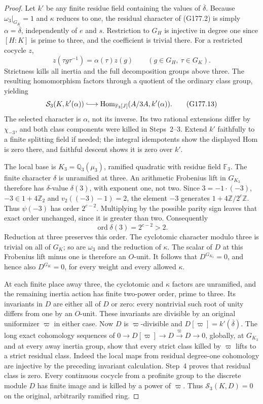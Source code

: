 \begin{proof}
Let $k'$ be any finite residue field containing the values of
$\overline\delta$.
Because $\omega_3|_{G_K}=1$ and $\kappa$ reduces to one, the
residual character of (G177.2) is simply $\alpha=\overline\delta$,
independently of $e$ and $s$.
Restriction to $G_H$ is injective in degree one since
$[H:K]$ is prime to three, and the coefficient is trivial there.
For a restricted cocycle $z$,
\[
 z(\tau g\tau^{-1})=\alpha(\tau)z(g)
                  \qquad(g\in G_H,\ \tau\in G_K).
 \tag{G177.12}
\]
Strictness kills all inertia and the full decomposition groups
above three.  The resulting homomorphism factors through a
quotient of the ordinary class group, yielding
\[
 \mathcal S_3(K,k'(\alpha))\lhook\joinrel\longrightarrow
          \operatorname{Hom}_{\mathbb F_3[J]}(A/3A,k'(\alpha)).
 \tag{G177.13}
\]
The selected character is $\alpha$, not its inverse.
Its two rational extensions differ by $\chi_{-3}$, and both
class components were killed in Steps~2--3.
Extend $k'$ faithfully to a finite splitting field if needed;
the integral idempotents show the displayed Hom is zero there,
and faithful descent shows it is zero over $k'$.

The local base is $K_3=\mathbb Q_3(\mu_3)$, ramified quadratic
with residue field $\mathbb F_3$.
The finite character $\delta$ is unramified at three.
An arithmetic Frobenius lift in $G_{K_3}$ therefore has
$\delta$-value $\delta(3)$, with exponent one, not two.
Since $3=-1\cdot(-3)$, $-3\in1+4\mathbb Z_2$ and
$v_2((-3)-1)=2$, the element $-3$ generates
$1+4\mathbb Z/2^c\mathbb Z$.
Thus $\psi(-3)$ has order $2^{c-2}$.
Multiplying by the possible parity sign leaves that exact order
unchanged, since it is greater than two.  Consequently
\[
                 \operatorname{ord}\delta(3)=2^{c-2}>2.
 \tag{G177.14}
\]
Reduction at three preserves this order.
The cyclotomic character modulo three is trivial on all of $G_K$;
so are $\omega_3$ and the reduction of $\kappa$.
The scalar of $D$ at this Frobenius lift minus one is therefore
an $O$-unit.  It follows that $D^{G_{K_3}}=0$, and hence also
$D^{G_K}=0$, for every weight and every allowed $\kappa$.

At each finite place away three, the cyclotomic and $\kappa$
factors are unramified, and the remaining inertia action has
finite two-power order, prime to three.
Its invariants in $D$ are either all of $D$ or zero: every
nontrivial such root of unity differs from one by an $O$-unit.
These invariants are divisible by an original uniformizer
$\varpi$ in either case.
Now $D$ is $\varpi$-divisible and
$D[\varpi]=k'(\overline\delta)$.
The long exact cohomology sequences of
$0\to D[\varpi]\to D\xrightarrow{\varpi}D\to0$, globally,
at $G_{K_3}$ and at every away inertia group, show that every
strict class killed by $\varpi$ lifts to a strict residual class.
Indeed the local maps from residual degree-one cohomology are
injective by the preceding invariant calculation.
Step~4 proves that residual class is zero.
Every continuous cocycle from a profinite group to the discrete
module $D$ has finite image and is killed by a power of $\varpi$.
Thus $\mathcal S_3(K,D)=0$ on the original, arbitrarily ramified ring.


\end{proof}
